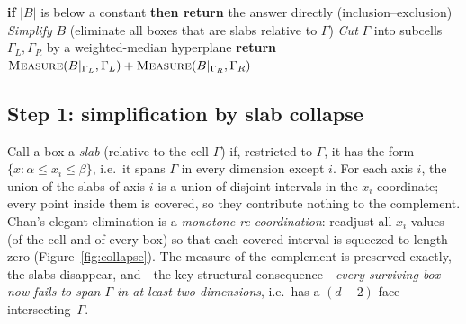 \documentclass[11pt,a4paper]{article}
\theoremstyle{remark}
\begin{document}
\begin{algorithm}[ht]
\caption{$\textsc{Measure}(B,\Gamma)$ --- measure of $\Gamma\setminus\bigcup B$ \cite{Chan2013}}
\begin{algorithmic}[1]
\State \textbf{if} $|B|$ is below a constant \textbf{then return} the answer directly (inclusion--exclusion)
\State \emph{Simplify} $B$ (eliminate all boxes that are slabs relative to $\Gamma$)
\State \emph{Cut} $\Gamma$ into subcells $\Gamma_L,\Gamma_R$ by a weighted-median hyperplane
\State \textbf{return} $\textsc{Measure}(B|_{\Gamma_L},\Gamma_L)+\textsc{Measure}(B|_{\Gamma_R},\Gamma_R)$
\end{algorithmic}
\label{alg:simple}
\end{algorithm}

\subsection{Step 1: simplification by slab collapse}

Call a box a \emph{slab} (relative to the cell $\Gamma$) if, restricted to
$\Gamma$, it has the form $\{x:\alpha\le x_i\le\beta\}$, i.e.\ it spans
$\Gamma$ in every dimension except $i$.  For each axis $i$, the union of the
slabs of axis $i$ is a union of disjoint intervals in the $x_i$-coordinate;
every point inside them is covered, so they contribute nothing to the
complement.  Chan's elegant elimination is a \emph{monotone re-coordination}:
readjust all $x_i$-values (of the cell and of every box) so that each covered
interval is squeezed to length zero (Figure~\ref{fig:collapse}).  The measure
of the complement is preserved exactly, the slabs disappear, and---the key
structural consequence---\emph{every surviving box now fails to span $\Gamma$
in at least two dimensions}, i.e.\ has a $(d{-}2)$-face intersecting~$\Gamma$.
\end{document}
